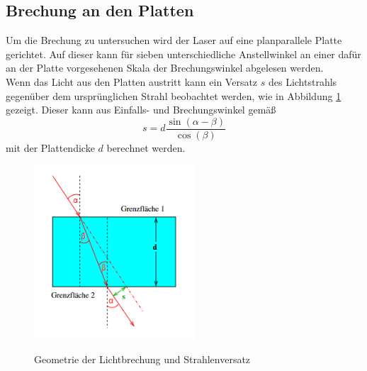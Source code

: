 \subsection{Brechung an den Platten}
Um die Brechung zu untersuchen wird der Laser auf eine planparallele Platte gerichtet. Auf dieser kann für sieben unterschiedliche Anstellwinkel an einer dafür an der Platte vorgesehenen Skala der Brechungswinkel abgelesen werden.\\
Wenn das Licht aus den Platten austritt kann ein Versatz $s$ des Lichtstrahls gegenüber dem ursprünglichen Strahl beobachtet werden, wie in Abbildung \ref{fig:Versatz} gezeigt. Dieser kann aus Einfalls- und Brechungswinkel gemäß
\begin{equation}
s=d \frac{\sin(\alpha - \beta)}{\cos(\beta)}
\end{equation}
mit der Plattendicke $d$ berechnet werden. \\
  \begin{figure} [h]
    \centering
    \includegraphics[width=6cm, keepaspectratio]{Planparallele Platten}
    \label{fig:Versatz}
    \caption{Geometrie der Lichtbrechung und Strahlenversatz}
 \end{figure}
